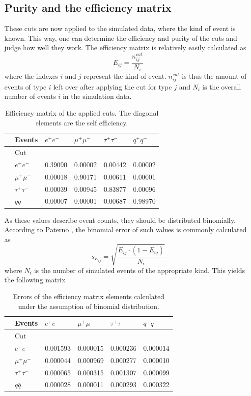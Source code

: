 \subsection{Purity and the efficiency matrix}
These cuts are now applied to the simulated data, where the kind of event is known. This way, one can determine the efficiency and purity of the cuts and judge how well they work. 
The efficiency matrix is relatively easily calculated as
\begin{equation}
E_{ij}=\frac{n^{cut}_{ij}}{N_i}
\end{equation}
where the indexes $i$ and $j$ represent the kind of event. $n_{ij}^{cut}$ is thus the amount of events of type $i$ left over after applying the cut for type $j$ and $N_i$ is the overall number of events $i$ in the simulation data.
\begin{table}[H]\centering
	\begin{tabular}{@{}llllll@{}}
		\toprule
		&Events &$e^+e^-$&$\mu^+\mu^-$&$\tau^+\tau^-$&$q^+q^-$\\
		\midrule
		&Cut&&&&\\
		&$e^+e^-$&0.39090&0.00002&0.00442&0.00002\\
		&$\mu^+\mu^-$&0.00018&0.90171&0.00611&0.00001\\
		&$\tau^+\tau^-$&0.00039&0.00945&0.83877&0.00096\\
		&$q\overline{q}$&0.00007&0.00001&0.00687&0.98970\\
	\end{tabular}
	\caption[Efficiency matrix]{Efficiency matrix of the applied cuts. The diagonal elements are the self efficiency.}
	\label{tb:efficiency}
\end{table}

As these values describe event counts, they should be distributed binomially. According to Paterno \cite{binpaper}, the binomial error of such values is commonly calculated as
\begin{equation}
s_{E_{ij}}=\sqrt{\frac{E_{ij}\cdot(1-E_{ij})}{N_i}}
\end{equation}
where $N_i$ is the number of simulated events of the appropriate kind. This yields the following matrix

\begin{table}[H]\centering
	\begin{tabular}{@{}llllll@{}}
		\toprule
		&Events &$e^+e^-$&$\mu^+\mu^-$&$\tau^+\tau^-$&$q^+q^-$\\
		\midrule
		&Cut&&&&\\
		&$e^+e^-$&0.001593&0.000015&0.000236&0.000014\\
		&$\mu^+\mu^-$&0.000044&0.000969&0.000277&0.000010\\
		&$\tau^+\tau^-$&0.000065&0.000315&0.001307&0.000099\\
		&$q\overline{q}$&0.000028&0.000011&0.000293&0.000322\\
		\bottomrule
	\end{tabular}
	\caption[Efficiency error matrix]{Errors of the efficiency matrix elements calculated under the assumption of binomial distribution.}
	\label{tb:efficiencyerr}
\end{table}

